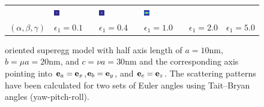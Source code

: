 \begin{figure}[htb]
\begin{center}
\begin{tabular}{llllll}
     & \includegraphics[width=0.15\textwidth]{../images/form_factor/supershapes/superegg_0_90_0_18m_1p0.png}
     & \includegraphics[width=0.15\textwidth]{../images/form_factor/supershapes/superegg_0_90_0_18m_2p0.png}
     & \includegraphics[width=0.15\textwidth]{../images/form_factor/supershapes/superegg_0_90_0_18m_5p0.png}  \\
{\small $(\alpha,\beta,\gamma)$}
     & {\small $\epsilon_1=0.1$}
     & {\small $\epsilon_1=0.4$}
     & {\small $\epsilon_1=1.0$}
     & {\small $\epsilon_1=2.0$}
     & {\small $\epsilon_1=5.0$}  %
\end{tabular}
\end{center}
\caption{oriented superegg model with half axis length of $a=10$nm, $b=\mu a=20$nm, and $c=\nu a=30$nm and the corresponding axis pointing into $\B{e}_a=\B{e}_x$,$\B{e}_b=\B{e}_y$, and $\B{e}_c=\B{e}_z$. The scattering patterns have been calculated for two sets of Euler angles using Tait–Bryan angles (yaw-pitch-roll). \label{fig:SuperEgg2D}}
\end{figure}

